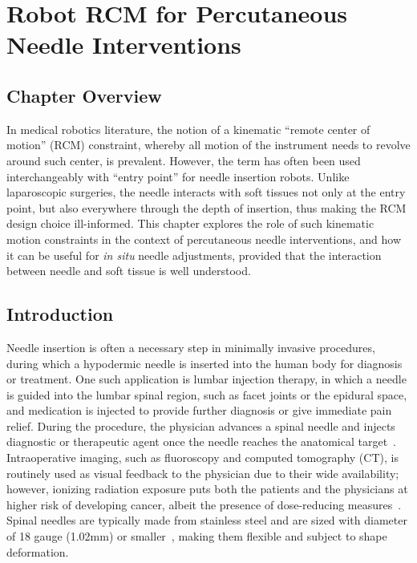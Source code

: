 \chapter{Robot RCM for Percutaneous Needle Interventions} \label{chap:chap-2}

\section{Chapter Overview}
\label{sec:chap-2-overview}

In medical robotics literature, the notion of a kinematic ``remote center of motion'' (RCM) constraint, whereby all motion of the instrument needs to revolve around such center, is prevalent. However, the term has often been used interchangeably with ``entry point'' for needle insertion robots. Unlike laparoscopic surgeries, the needle interacts with soft tissues not only at the entry point, but also everywhere through the depth of insertion, thus making the RCM design choice ill-informed. This chapter explores the role of such kinematic motion constraints in the context of percutaneous needle interventions, and how it can be useful for \textit{in situ} needle adjustments, provided that the interaction between needle and soft tissue is well understood.

\section{Introduction}
\label{sec:chap-2-introduction}

Needle insertion is often a necessary step in minimally invasive procedures, during which a hypodermic needle is inserted into the human body for diagnosis or treatment. One such application is lumbar injection therapy, in which a needle is guided into the lumbar spinal region, such as facet joints or the epidural space, and medication is injected to provide further diagnosis or give immediate pain relief. During the procedure, the physician advances a spinal needle and injects diagnostic or therapeutic agent once the needle reaches the anatomical target~\parencite{silbergleitImagingguidedInjectionTechniques2001}. Intraoperative imaging, such as fluoroscopy and computed tomography (CT), is routinely used as visual feedback to the physician due to their wide availability; however, ionizing radiation exposure puts both the patients and the physicians at higher risk of developing cancer, albeit the presence of dose-reducing measures~\parencite{giordanoCervicalSpineImaging2008,leeMeasurementsSurgeonsExposure2012}. Spinal needles are typically made from stainless steel and are sized with diameter of 18 gauge (1.02mm) or smaller~\parencite{silbergleitImagingguidedInjectionTechniques2001,calthorpeHistorySpinalNeedles2004,tsenNeedlesUsedSpinal2006}, making them flexible and subject to shape deformation.

